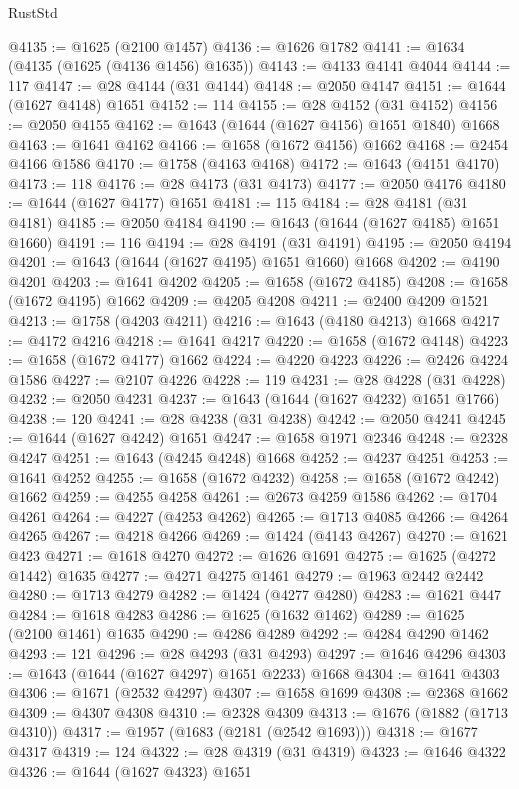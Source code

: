 \begin{lexlean}{RustStd}
\begin{coremodule}
@4135 := @1625 (@2100 @1457)
@4136 := @1626 @1782
@4141 := @1634 (@4135 (@1625 (@4136 @1456) @1635))
@4143 := @4133 @4141 @4044
@4144 := 117
@4147 := @28 @4144 (@31 @4144)
@4148 := @2050 @4147
@4151 := @1644 (@1627 @4148) @1651
@4152 := 114
@4155 := @28 @4152 (@31 @4152)
@4156 := @2050 @4155
@4162 := @1643 (@1644 (@1627 @4156) @1651 @1840) @1668
@4163 := @1641 @4162
@4166 := @1658 (@1672 @4156) @1662
@4168 := @2454 @4166 @1586
@4170 := @1758 (@4163 @4168)
@4172 := @1643 (@4151 @4170)
@4173 := 118
@4176 := @28 @4173 (@31 @4173)
@4177 := @2050 @4176
@4180 := @1644 (@1627 @4177) @1651
@4181 := 115
@4184 := @28 @4181 (@31 @4181)
@4185 := @2050 @4184
@4190 := @1643 (@1644 (@1627 @4185) @1651 @1660)
@4191 := 116
@4194 := @28 @4191 (@31 @4191)
@4195 := @2050 @4194
@4201 := @1643 (@1644 (@1627 @4195) @1651 @1660) @1668
@4202 := @4190 @4201
@4203 := @1641 @4202
@4205 := @1658 (@1672 @4185)
@4208 := @1658 (@1672 @4195) @1662
@4209 := @4205 @4208
@4211 := @2400 @4209 @1521
@4213 := @1758 (@4203 @4211)
@4216 := @1643 (@4180 @4213) @1668
@4217 := @4172 @4216
@4218 := @1641 @4217
@4220 := @1658 (@1672 @4148)
@4223 := @1658 (@1672 @4177) @1662
@4224 := @4220 @4223
@4226 := @2426 @4224 @1586
@4227 := @2107 @4226
@4228 := 119
@4231 := @28 @4228 (@31 @4228)
@4232 := @2050 @4231
@4237 := @1643 (@1644 (@1627 @4232) @1651 @1766)
@4238 := 120
@4241 := @28 @4238 (@31 @4238)
@4242 := @2050 @4241
@4245 := @1644 (@1627 @4242) @1651
@4247 := @1658 @1971 @2346
@4248 := @2328 @4247
@4251 := @1643 (@4245 @4248) @1668
@4252 := @4237 @4251
@4253 := @1641 @4252
@4255 := @1658 (@1672 @4232)
@4258 := @1658 (@1672 @4242) @1662
@4259 := @4255 @4258
@4261 := @2673 @4259 @1586
@4262 := @1704 @4261
@4264 := @4227 (@4253 @4262)
@4265 := @1713 @4085
@4266 := @4264 @4265
@4267 := @4218 @4266
@4269 := @1424 (@4143 @4267)
@4270 := @1621 @423
@4271 := @1618 @4270
@4272 := @1626 @1691
@4275 := @1625 (@4272 @1442) @1635
@4277 := @4271 @4275 @1461
@4279 := @1963 @2442 @2442
@4280 := @1713 @4279
@4282 := @1424 (@4277 @4280)
@4283 := @1621 @447
@4284 := @1618 @4283
@4286 := @1625 (@1632 @1462)
@4289 := @1625 (@2100 @1461) @1635
@4290 := @4286 @4289
@4292 := @4284 @4290 @1462
@4293 := 121
@4296 := @28 @4293 (@31 @4293)
@4297 := @1646 @4296
@4303 := @1643 (@1644 (@1627 @4297) @1651 @2233) @1668
@4304 := @1641 @4303
@4306 := @1671 (@2532 @4297)
@4307 := @1658 @1699
@4308 := @2368 @1662
@4309 := @4307 @4308
@4310 := @2328 @4309
@4313 := @1676 (@1882 (@1713 @4310))
@4317 := @1957 (@1683 (@2181 (@2542 @1693)))
@4318 := @1677 @4317
@4319 := 124
@4322 := @28 @4319 (@31 @4319)
@4323 := @1646 @4322
@4326 := @1644 (@1627 @4323) @1651

\end{coremodule}
\end{lexlean}
